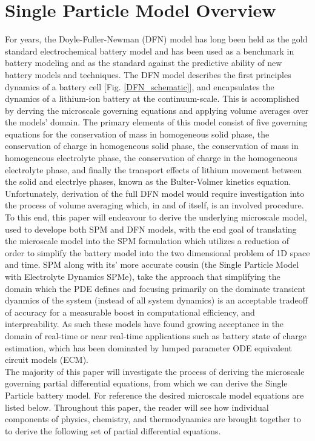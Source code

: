 \documentclass[lettersize,journal]{IEEEtran}
\begin{document}
\section{Single Particle Model Overview}
For years, the Doyle-Fuller-Newman (DFN) model has long been held as the gold standard electrochemical battery model and has been used as a benchmark in battery modeling and as the standard against the predictive ability of new battery models and techniques. The DFN model describes the first principles dynamics of a battery cell [Fig. \ref{DFN_schematic}], and encapsulates the dynamics of a lithium-ion battery at the continuum-scale. This is accomplished by derving the microscale governing equations and applying volume averages over the models' domain. The primary elements of this model consist of five governing equations for the conservation of mass in homogeneous solid phase, the conservation of charge in homogeneous solid phase, the conservation of mass in homogeneous electrolyte phase, the conservation of charge in the homogeneous electrolyte phase, and finally the transport effects of lithium movement between the solid and electrlye phases, known as the Bulter-Volmer kinetics equation. \\

Unfortunately, derivation of the full DFN model would require investigation into the process of volume averaging which, in and of itself, is an involved procedure. To this end, this paper will endeavour to derive the underlying microscale model, used to develope both SPM and DFN models, with the end goal of translating the microscale model into the SPM formulation which utilizes a reduction of order to simplify the battery model into the two dimensional problem of 1D space and time. SPM along with its' more accurate cousin (the Single Particle Model with Electrolyte Dynamics {SPMe}), take the approach that simplifying the domain which the PDE defines and focusing primarily on the dominate transient dyanmics of the system (instead of all system dynamics) is an acceptable tradeoff of accuracy for a measurable boost in computational efficiency, and interpreability. As such these models have found growing acceptance in the domain of real-time or near real-time applications such as battery state of charge estimation, which has been dominated by lumped parameter ODE equivalent circuit models (ECM). \\

 The majority of this paper will investigate the process of deriving the microscale governing partial differential equations, from which we can derive the Single Particle battery model. For reference the desired microscale model equations are listed below. Throughout this paper, the reader will see how individual components of physics, chemistry, and thermodynamics are brought together to to derive the following set of partial differential equations.
\end{document}
